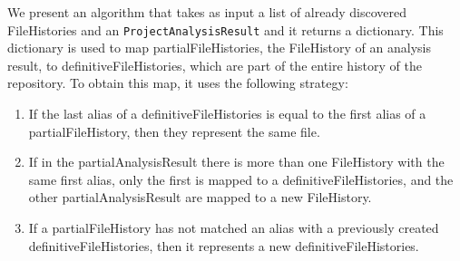 We present an algorithm that takes as input a list of already discovered FileHistories and an \texttt{ProjectAnalysisResult} and it returns a dictionary.
This dictionary is used to map partialFileHistories, the FileHistory of an analysis result, to definitiveFileHistories, which are part of the entire history of the repository. 
To obtain this map, it uses the following strategy:
\begin{enumerate}
    \item If the last alias of a definitiveFileHistories is equal to the first alias of a partialFileHistory, then they represent the same file.
    \item If in the partialAnalysisResult there is more than one FileHistory with the same first alias, only the first is mapped to a definitiveFileHistories, and the other partialAnalysisResult are mapped to a new FileHistory.
    \item If a partialFileHistory has not matched an alias with a previously created definitiveFileHistories, then it represents a new definitiveFileHistories.
\end{enumerate}

        

